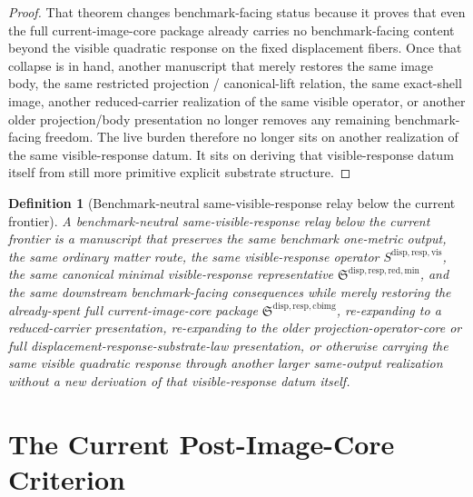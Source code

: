 \documentclass[11pt]{article}
\newcommand{\CurrentBodyImageCore}{\mathfrak S^{\mathrm{disp,resp,cbimg}}}
\newcommand{\VisibleResponseOperator}{S^{\mathrm{disp,resp,vis}}}
\newcommand{\MinimalReducedStructure}{\mathfrak S^{\mathrm{disp,resp,red,min}}}
\newtheorem{definition}{Definition}
\begin{document}
\begin{proof}
That theorem changes benchmark-facing status because it proves that even the full current-image-core package already carries no benchmark-facing content beyond the visible quadratic response on the fixed displacement fibers. Once that collapse is in hand, another manuscript that merely restores the same image body, the same restricted projection / canonical-lift relation, the same exact-shell image, another reduced-carrier realization of the same visible operator, or another older projection/body presentation no longer removes any remaining benchmark-facing freedom. The live burden therefore no longer sits on another realization of the same visible-response datum. It sits on deriving that visible-response datum itself from still more primitive explicit substrate structure.
\end{proof}

\begin{definition}[Benchmark-neutral same-visible-response relay below the current frontier]
A \emph{benchmark-neutral same-visible-response relay below the current frontier} is a manuscript that preserves the same benchmark one-metric output, the same ordinary matter route, the same visible-response operator \(\VisibleResponseOperator\), the same canonical minimal visible-response representative \(\MinimalReducedStructure\), and the same downstream benchmark-facing consequences while merely restoring the already-spent full current-image-core package \(\CurrentBodyImageCore\), re-expanding to a reduced-carrier presentation, re-expanding to the older projection-operator-core or full displacement-response-substrate-law presentation, or otherwise carrying the same visible quadratic response through another larger same-output realization without a new derivation of that visible-response datum itself.
\end{definition}

\section{The Current Post-Image-Core Criterion}
\end{document}

